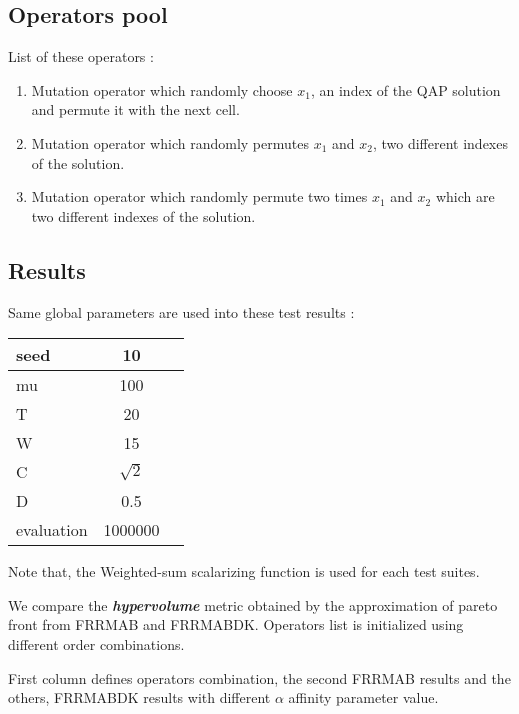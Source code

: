 \documentclass{article}
\newcommand\tab[1][0.6cm]{\hspace*{#1}}
\begin{document}
\subsection{Operators pool}
List of these operators :
\begin{enumerate}
    \item Mutation operator which randomly choose $x_1$, an index of the QAP solution and permute it with the next cell. 
    \item Mutation operator which randomly permutes $x_1$ and $x_2$, two different indexes of the solution.
    \item Mutation operator which randomly permute two times $x_1$ and $x_2$ which are two different indexes of the solution.
\end{enumerate}


\subsection{Results}

\tab Same global parameters are used into these test results :

\begin{center}
    \begin{tabular}{|l|c|r|}
      \hline
       seed & 10 \\
      \hline
       mu & 100 \\
      \hline
       T & 20 \\
      \hline
       W & 15 \\
      \hline
       C & $\sqrt{2}$ \\
      \hline
       D & 0.5 \\
      \hline
       evaluation & 1000000 \\
      \hline
    \end{tabular}
\end{center}

Note that, the Weighted-sum scalarizing function is used for each test suites.

\vspace{3mm}

\tab We compare the \textit{\textbf{hypervolume}} metric obtained by the approximation of pareto front from FRRMAB and FRRMABDK. Operators list is initialized using different order combinations. 

\vspace{3mm}
First column defines operators combination, the second FRRMAB results and the others, FRRMABDK results with different \textbf{$\alpha$} affinity parameter value.
  
\end{document}
